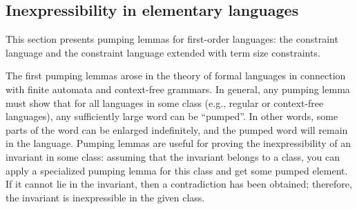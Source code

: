 



\subsection{Inexpressibility in elementary languages}
This section presents pumping lemmas for first-order languages: the constraint language and the constraint language extended with term size constraints.


The first pumping lemmas arose in the theory of formal languages in connection with finite automata and context-free grammars.
In general, any pumping lemma must show that for all languages in some class (e.g., regular or context-free languages), any sufficiently large word can be ``pumped''. In other words, some parts of the word can be enlarged indefinitely, and the pumped word will remain in the language. Pumping lemmas are useful for proving the inexpressibility of an invariant in some class: assuming that the invariant belongs to a class, you can apply a specialized pumping lemma for this class and get some pumped element. If it cannot lie in the invariant, then a contradiction has been obtained; therefore, the invariant is inexpressible in the given class.

